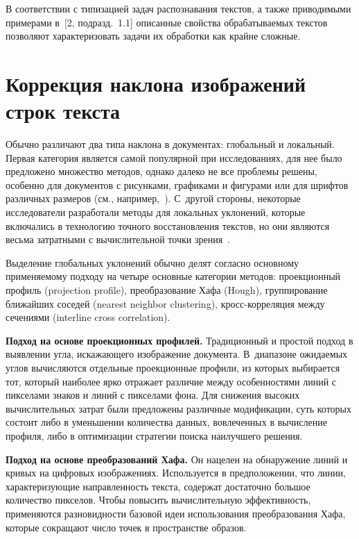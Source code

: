 \begin{multicols}{2}
      В соответствии с типизацией задач распознавания текстов, а также приводимыми 
примерами в~[2, под\-разд.~1.1] описанные свойства обрабатываемых текстов 
позволяют характеризовать задачи их обработки как крайне сложные. 
\section{Коррекция наклона изображений строк текста}
      
      Обычно различают два типа наклона в документах: глобальный и локальный. 
Первая категория является самой популярной при исследованиях, для нее было 
предложено множество методов, однако далеко не все проблемы решены, особенно для 
документов с рисунками, графиками и фигурами или для шрифтов различных размеров 
(см., например,~\cite{8-kr}). С~другой стороны, некоторые исследователи разработали 
методы для локальных уклонений, которые включались в технологию точного 
восстановления текстов, но они являются весьма затратными с вычислительной точки 
зрения~\cite{7-kr}. 
      
      Выделение глобальных уклонений обычно делят согласно основному 
применяемому подходу на четыре основные категории методов: проекционный профиль 
(projection profile), преобразование Хафа (Hough), группирование ближайших соседей 
(nearest neighbor clustering), кросс-кор\-ре\-ля\-ция между сечениями (interline cross 
correlation).
      
      \smallskip
      
      \textbf{Подход на основе проекционных профилей.} Традиционный и простой 
подход в выявлении угла, искажающего изображение документа. В~диапазоне ожидаемых 
углов вычисляются отдельные проекционные профили, из которых выбирается тот, 
который наиболее ярко отражает различие между особенностями линий с пикселами 
знаков и линий с пикселами фона. Для снижения высоких вычислительных затрат были 
предложены различные модификации, суть которых состоит либо в уменьшении 
количества данных, вовлеченных в вы\-чис\-ле\-ние профиля, либо в оптимизации стратегии 
поиска наилучшего решения.
      
      \smallskip
      
      \textbf{Подход на основе преобразований Хафа.} Он нацелен на обнаружение 
линий и кривых на цифровых изображениях. Используется в предположении, что линии, 
характеризующие направленность текста, содержат достаточно большое количество 
пикселов. Чтобы повысить вы\-чис\-ли\-тель\-ную эффективность, применяются разновидности 
базовой идеи использования преобразования Хафа, которые сокращают число точек в 
пространстве образов.
      

\end{multicols}
